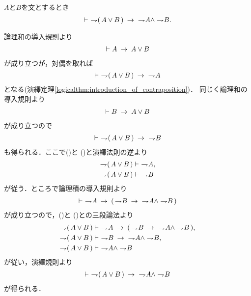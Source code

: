 	\begin{screen}
		\begin{logicalthm}
		\label{logicalthm:weak_De_Morgan_law_2}
			$A$と$B$を文とするとき
			\begin{align}
				\vdash\ \rightharpoondown\hspace{-0.25em} (\, A \vee B\, ) 
				\hspace{0.25em}\rightarrow\hspace{0.25em}\ \rightharpoondown\hspace{-0.25em} A \wedge \rightharpoondown\hspace{-0.25em} B.
			\end{align}
		\end{logicalthm}
	\end{screen}
	
	\begin{prf}
		論理和の導入規則より
		\begin{align}
			\vdash A \hspace{0.25em}\rightarrow\hspace{0.25em} A \vee B
		\end{align}
		が成り立つが，対偶を取れば
		\begin{align}
			\vdash\ \rightharpoondown\hspace{-0.25em} (\, A \vee B\, ) \hspace{0.25em}\rightarrow\hspace{0.25em}\ \rightharpoondown\hspace{-0.25em} A
			\label{fom:weak_De_Morgan_law_2_1}
		\end{align}
		となる(演繹定理\ref{logicalthm:introduction_of_contraposition})．
		同じく論理和の導入規則より
		\begin{align}
			\vdash B \hspace{0.25em}\rightarrow\hspace{0.25em} A \vee B
		\end{align}
		が成り立つので
		\begin{align}
			\vdash\ \rightharpoondown\hspace{-0.25em} (\, A \vee B\, ) \hspace{0.25em}\rightarrow\hspace{0.25em}\ \rightharpoondown\hspace{-0.25em} B
			\label{fom:weak_De_Morgan_law_2_2}
		\end{align}
		も得られる．ここで()と
		()と演繹法則の逆より
		\begin{align}
			\rightharpoondown\hspace{-0.25em} (\, A \vee B\, ) &\vdash\ \rightharpoondown\hspace{-0.25em} A, 
			\label{fom:weak_De_Morgan_law_2_3} \\
			\rightharpoondown\hspace{-0.25em} (\, A \vee B\, ) &\vdash\ \rightharpoondown\hspace{-0.25em} B
			\label{fom:weak_De_Morgan_law_2_4}
		\end{align}
		が従う．ところで論理積の導入規則より
		\begin{align}
			\vdash\ \rightharpoondown\hspace{-0.25em} A \hspace{0.25em}\rightarrow\hspace{0.25em} (\, \rightharpoondown\hspace{-0.25em} B \hspace{0.25em}\rightarrow\hspace{0.25em}\
			\rightharpoondown\hspace{-0.25em} A \wedge \rightharpoondown\hspace{-0.25em} B\, )
		\end{align}
		が成り立つので，()と
		()との三段論法より
		\begin{align}
			\negation (\, A \vee B\, ) &\vdash\ \negation A \rarrow 
				(\, \negation B \rarrow\ \negation A \wedge \negation B\, ), \\
			\negation (\, A \vee B\, ) &\vdash\ 
				\negation B \rarrow\ \negation A \wedge \negation B, \\
			\negation (\, A \vee B\, ) &\vdash\ \negation A \wedge \negation B
		\end{align}
		が従い，演繹規則より
		\begin{align}
			\vdash\ \rightharpoondown\hspace{-0.25em} (\, A \vee B\, ) 
			\hspace{0.25em}\rightarrow\hspace{0.25em}\ \rightharpoondown\hspace{-0.25em} A \wedge \rightharpoondown\hspace{-0.25em} B
		\end{align}
		が得られる．
		\QED
	\end{prf}
	
